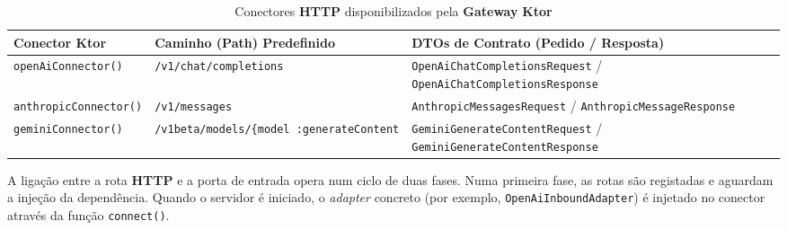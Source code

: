     \begin{table}[H]
        \centering
        \footnotesize
        \renewcommand{\arraystretch}{1.25}
        \begin{tabularx}{\textwidth}{|>{\raggedright\arraybackslash}p{3.5cm}|>{\raggedright\arraybackslash}p{4cm}|Y|}
            \hline
            \textbf{Conector Ktor} & \textbf{Caminho (Path) Predefinido} & \textbf{DTOs de Contrato (Pedido / Resposta)} \\
            \hline
            \texttt{openAiConnector()} & \texttt{/v1/chat/completions} & \texttt{OpenAiChatCompletionsRequest} / \texttt{OpenAiChatCompletionsResponse} \\
            \hline
            \texttt{anthropicConnector()} & \texttt{/v1/messages} & \texttt{AnthropicMessagesRequest} / \texttt{AnthropicMessageResponse} \\
            \hline
            \texttt{geminiConnector()} & \texttt{/v1beta/models/\{model\
            :generateContent} & \texttt{GeminiGenerateContentRequest} / \texttt{GeminiGenerateContentResponse} \\
            \hline
        \end{tabularx}
        \caption{Conectores \textbf{HTTP} disponibilizados pela \textbf{Gateway} \textbf{Ktor}}
        \label{tab:ktor-connectors}
    \end{table}

    A ligação entre a rota \textbf{HTTP} e a porta de entrada opera num ciclo de duas fases. Numa primeira fase, as rotas são registadas e aguardam a injeção da dependência. Quando o servidor é iniciado, o \textit{adapter} concreto (por exemplo, \texttt{OpenAiInboundAdapter}) é injetado no conector através da função \texttt{connect()}.
    
